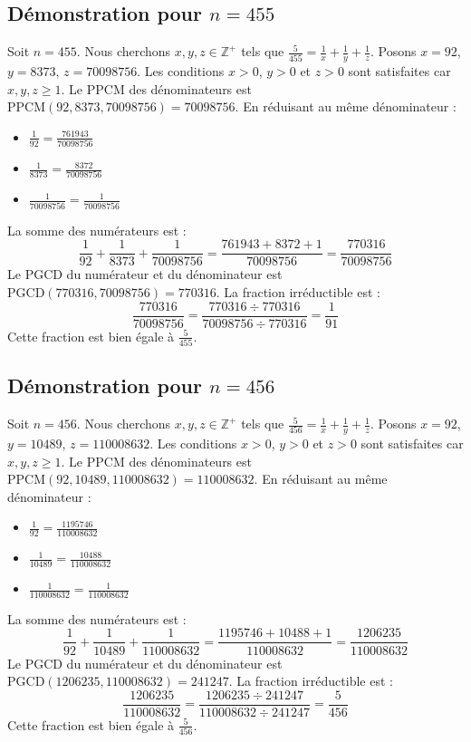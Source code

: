 \documentclass[11pt,a4paper]{article}
\begin{document}
\subsection{Démonstration pour $n = 455$}
Soit $n = 455$. Nous cherchons $x, y, z \in \mathbb{Z}^{+}$ tels que $\frac{5}{455} = \frac{1}{x} + \frac{1}{y} + \frac{1}{z}$.
Posons $x = 92$, $y = 8373$, $z = 70098756$.
Les conditions $x > 0$, $y > 0$ et $z > 0$ sont satisfaites car $x, y, z \geq 1$.
Le PPCM des dénominateurs est $\text{PPCM}(92, 8373, 70098756) = 70098756$.
En réduisant au même dénominateur :
\begin{itemize}
    \item $\frac{1}{92} = \frac{761943}{70098756}$
    \item $\frac{1}{8373} = \frac{8372}{70098756}$
    \item $\frac{1}{70098756} = \frac{1}{70098756}$
\end{itemize}
La somme des numérateurs est :
$$ \frac{1}{92} + \frac{1}{8373} + \frac{1}{70098756} = \frac{761943 + 8372 + 1}{70098756} = \frac{770316}{70098756} $$
Le PGCD du numérateur et du dénominateur est $\text{PGCD}(770316, 70098756) = 770316$.
La fraction irréductible est :
$$ \frac{770316}{70098756} = \frac{770316 \div 770316}{70098756 \div 770316} = \frac{1}{91} $$
Cette fraction est bien égale à $\frac{5}{455}$.

\subsection{Démonstration pour $n = 456$}
Soit $n = 456$. Nous cherchons $x, y, z \in \mathbb{Z}^{+}$ tels que $\frac{5}{456} = \frac{1}{x} + \frac{1}{y} + \frac{1}{z}$.
Posons $x = 92$, $y = 10489$, $z = 110008632$.
Les conditions $x > 0$, $y > 0$ et $z > 0$ sont satisfaites car $x, y, z \geq 1$.
Le PPCM des dénominateurs est $\text{PPCM}(92, 10489, 110008632) = 110008632$.
En réduisant au même dénominateur :
\begin{itemize}
    \item $\frac{1}{92} = \frac{1195746}{110008632}$
    \item $\frac{1}{10489} = \frac{10488}{110008632}$
    \item $\frac{1}{110008632} = \frac{1}{110008632}$
\end{itemize}
La somme des numérateurs est :
$$ \frac{1}{92} + \frac{1}{10489} + \frac{1}{110008632} = \frac{1195746 + 10488 + 1}{110008632} = \frac{1206235}{110008632} $$
Le PGCD du numérateur et du dénominateur est $\text{PGCD}(1206235, 110008632) = 241247$.
La fraction irréductible est :
$$ \frac{1206235}{110008632} = \frac{1206235 \div 241247}{110008632 \div 241247} = \frac{5}{456} $$
Cette fraction est bien égale à $\frac{5}{456}$.
\end{document}
